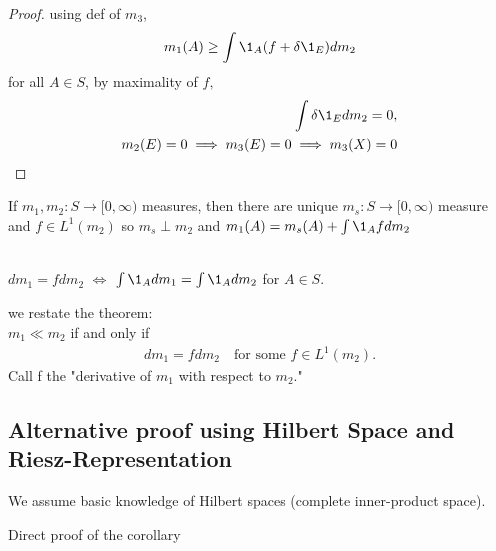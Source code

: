 \begin{proof}
	using def of $m_3$,
	\begin{align*}
		m_1 (A) \geq \int \1_A (f + \delta \1_E ) d m_2
	\end{align*}
	for all $A \in S$, by maximality of $f,$
	\begin{align*}
		\int \delta \1_E dm_2 = 0, \\
		m_2 (E) = 0 \implies m_3 (E) = 0 \implies m_3 (X) = 0
	\end{align*}
\end{proof}



\begin{corollary}
	If $m_1, m_2 : S \to [0, \infty)$	 measures, then there are unique $m_s :S \to [0, \infty)$ measure and
	$f \in L^{1} (m_2)$ so $m_s \perp m_2$ and $m_1 (A) = m_s (A) + \int \1_A f d m_2$
\end{corollary}

\begin{remark*}[Notation] \\
	$d m_1 = f dm_2$ $\iff $ $\int \1_A d m_1 = \int \1_A d m_2$ for $A \in S$.
\end{remark*}

\begin{theorem} we restate the theorem: \\
	$m_1 \ll m_2$ if and only if
	\begin{align*}
		d m_1 = f d m_2 \quad \text{for some } f \in L^1 (m_2) .
	\end{align*}
	Call f the "derivative of $m_1$ with respect to $m_2$."
\end{theorem}

\subsection{Alternative proof using Hilbert Space and Riesz-Representation}



We assume basic knowledge of Hilbert spaces (complete inner-product space).

Direct proof of the corollary

